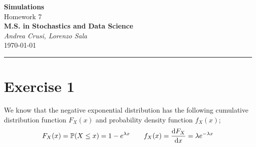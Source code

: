 \documentclass[12pt]{article}
\begin{document}
	\textcolor{UM_Brown}{
		\begin{center}
			\textbf{\Large Simulations}\\
			\vspace{5pt}
			Homework 7 \\
			\vspace{5pt}
			\textbf{M.S. in Stochastics and Data Science}\\
			\vspace{20pt}
			\textit{Andrea Crusi, Lorenzo Sala} \\
			\vspace{5pt}
			\today
		\end{center}
		\vspace{10pt}
		\hrule
	}
	
	
	
	\section{Exercise 1}
	We know that the negative exponential distribution has the following cumulative distribution function $F_X(x)$ and probability density function $f_X(x)$;
	\begin{equation*}
		F_X(x)=\mathbb{P}(X\leq x)=1-e^{\lambda x}\qquad f_X(x)=\frac{\mathop{}\!\mathrm{d} F_X}{\mathop{}\!\mathrm{d} x}=\lambda e^{-\lambda x}
	\end{equation*}
\end{document}
